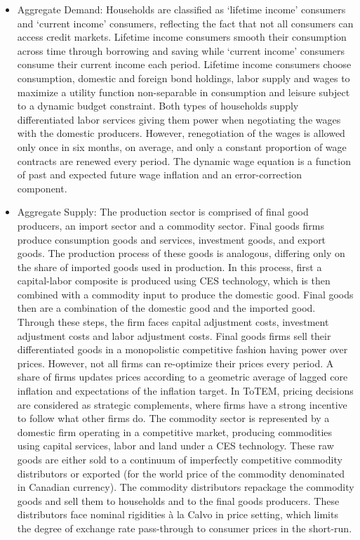 \documentclass[11pt,a4paper]{article}
\begin{document}
	
	\begin{itemize}
		
		\item Aggregate Demand: Households are classified as `lifetime income' consumers and `current income' consumers, reflecting the fact that not all consumers can access credit markets. Lifetime income consumers smooth their consumption across time through borrowing and saving while `current income' consumers consume their current income each period. Lifetime income consumers choose consumption, domestic and foreign bond holdings, labor supply and wages to maximize a utility function non-separable in consumption and leisure subject to a dynamic budget constraint. Both types of households supply differentiated labor services giving them power when negotiating the wages with the domestic producers. However, renegotiation of the wages is allowed only once in six months, on average, and only a constant proportion of wage contracts are renewed every period. The dynamic wage equation is a function of past and expected future wage inflation and an error-correction component.
		
		\item Aggregate Supply: The production sector is comprised of final good producers, an import sector and a commodity sector. Final goods firms produce consumption goods and services, investment goods, and export goods. The production process of these goods is analogous, differing only on the share of imported goods used in production. In this process, first a capital-labor composite is produced using CES technology, which is then combined with a commodity input to produce the domestic good. Final goods then are a combination of the domestic good and the imported good. Through these steps, the firm faces capital adjustment costs, investment adjustment costs and labor adjustment costs. Final goods firms sell their differentiated goods in a monopolistic competitive fashion having power over prices. However, not all firms can re-optimize their prices every period. A share of firms updates prices according to a geometric average of lagged core inflation and expectations of the inflation target. In ToTEM, pricing decisions are considered as strategic complements, where firms have a strong incentive to follow what other firms do. The commodity sector is represented by a domestic firm operating in a competitive market, producing commodities using capital services, labor and land under a CES technology. These raw goods are either sold to a continuum of imperfectly competitive commodity distributors or exported (for the world price of the commodity denominated in Canadian currency). The commodity distributors repackage the commodity goods and sell them to households and to the final goods producers. These distributors face nominal rigidities \`{a} la Calvo in price setting, which limits the degree of exchange rate pass-through to consumer prices in the short-run.
		

\end{itemize}
\end{document}
